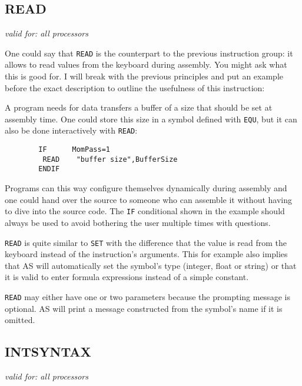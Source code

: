 \documentclass[12pt,twoside]{report}
\makeatletter
\newcommand{\tty}[1]{{\tt #1}}
\newcommand{\ttindex}[1]{\index{#1@{\tt #1}}}
\makeatother
\begin{document}
\subsection{READ}
\ttindex{READ}

{\em valid for: all processors}

One could say that \tty{READ} is the counterpart to the previous
instruction group: it allows to read values from the keyboard during
assembly.  You might ask what this is good for.  I will break with
the previous principles and put an example before the exact
description to outline the usefulness of this instruction:

A program needs for data transfers a buffer of a size that should be
set at assembly time.  One could store this size in a symbol defined
with \tty{EQU}, but it can also be done interactively with \tty{READ}:
\begin{verbatim}
        IF      MomPass=1
         READ    "buffer size",BufferSize
        ENDIF
\end{verbatim}
Programs can this way configure themselves dynamically during assembly
and one could hand over the source to someone who can assemble it
without having to dive into the source code.  The \tty{IF} conditional
shown in the example should always be used to avoid bothering the
user multiple times with questions.

\tty{READ} is quite similar to \tty{SET} with the difference that the
value is read from the keyboard instead of the instruction's arguments.
This for example also implies that AS will automatically set the symbol's
type (integer, float or string) or that it is valid to enter formula
expressions instead of a simple constant.

\tty{READ} may either have one or two parameters because the prompting
message is optional.  AS will print a message constructed from the
symbol's name if it is omitted.


\subsection{INTSYNTAX}
\label{SectINTSYNTAX}
\ttindex{INTSYNTAX}

{\em valid for: all processors}
\end{document}
